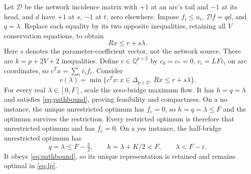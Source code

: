 \documentclass[11pt]{article}
\theoremstyle{remark}\newtheorem{remark}[theorem]{Remark}
\newcommand{\Q}{\mathbb Q}
\newcommand{\eps}{\varepsilon}
\begin{document}
Let $\mathcal D$ be the network incidence matrix with $+1$ at an arc's tail and $-1$ at its head, and $d$ have $+1$ at $s$, $-1$ at $t$, zero elsewhere. Impose $f_i\le u_i$, $\mathcal Df=qd$, and $q=\lambda$. Replace each equality by its two opposite inequalities, retaining all $V$ conservation equations, to obtain
\[
 Rx\le r+s\lambda.
\]
Here $s$ denotes the parameter-coefficient vector, not the network source. There are $k=p+2V+2$ inequalities. Define $c\in\Q^{p+2}$ by $c_0=c_*=0$, $c_i=LF\bar c_i$ on arc coordinates, so $c^Tx=\sum_i\bar c_i f_i$. Consider
\begin{equation}\label{eq:lp}
 v(\lambda)=\min\{c^Tx:x\in\Delta_{p+2},\ Rx\le r+s\lambda\}.
\end{equation}
For every real $\lambda\in[0,F]$, scale the zero-bridge maximum flow. It has $h=q=\lambda$ and satisfies \eqref{eq:pathbound}, proving feasibility and compactness. On a no instance, the unique unrestricted optimum has $f_e=0$, so $h=q=\lambda\le F$ and the optimum survives the restriction. Every restricted optimum is therefore that unrestricted optimum and has $f_e=0$. On a yes instance, the half-bridge unrestricted optimum has
\[
 q=\lambda\le F-\tfrac32,\qquad h=\lambda+K/2<F,
 \qquad\lambda<F-\eps.
\]
It obeys \eqref{eq:pathbound}, so its unique representation is retained and remains optimal in \eqref{eq:lp}.
\end{document}
